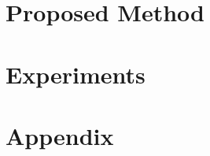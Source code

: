 \documentclass[12pt]{article}
\begin{document}
%	

\section{Proposed Method}
    \label{sec:proposed}
    


\section{Experiments}
    \label{sec:experiments}
    

%    





\newpage
\appendix
\section{Appendix}


\newpage
{}
\tableofcontents
\end{document}
